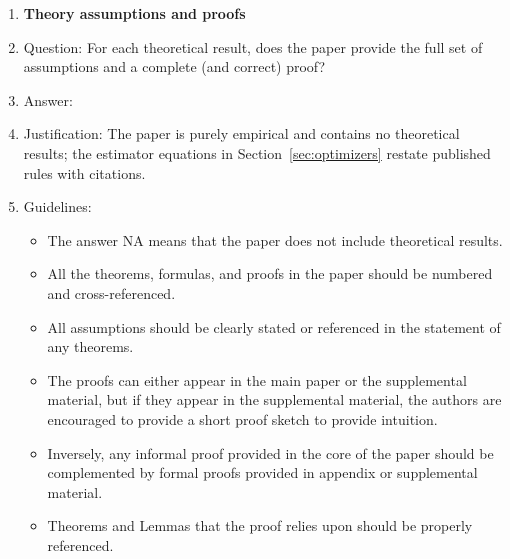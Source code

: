 \documentclass{article}
\begin{document}
\begin{enumerate}
\begin{itemize}
        \item While the authors might fear that complete honesty about limitations might be used by reviewers as grounds for rejection, a worse outcome might be that reviewers discover limitations that aren't acknowledged in the paper. The authors should use their best judgment and recognize that individual actions in favor of transparency play an important role in developing norms that preserve the integrity of the community. Reviewers will be specifically instructed to not penalize honesty concerning limitations.
    \end{itemize}

\item {\bf Theory assumptions and proofs}
    \item[] Question: For each theoretical result, does the paper provide the full set of assumptions and a complete (and correct) proof?
    \item[] Answer: \answerNA{}
    \item[] Justification: The paper is purely empirical and contains no theoretical results; the estimator equations in Section~\ref{sec:optimizers} restate published rules with citations.
    \item[] Guidelines:
    \begin{itemize}
        \item The answer NA means that the paper does not include theoretical results.
        \item All the theorems, formulas, and proofs in the paper should be numbered and cross-referenced.
        \item All assumptions should be clearly stated or referenced in the statement of any theorems.
        \item The proofs can either appear in the main paper or the supplemental material, but if they appear in the supplemental material, the authors are encouraged to provide a short proof sketch to provide intuition.
        \item Inversely, any informal proof provided in the core of the paper should be complemented by formal proofs provided in appendix or supplemental material.
        \item Theorems and Lemmas that the proof relies upon should be properly referenced.
    \end{itemize}


\end{enumerate}
\end{document}
